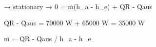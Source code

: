 → stationary → 0 = ṁ(h_a - h_e) + Q̇R - Q̇aus  

Q̇R - Q̇aus = 70000 W + 65000 W = 35000 W  

ṁ = Q̇R - Q̇aus / h_a - h_e
